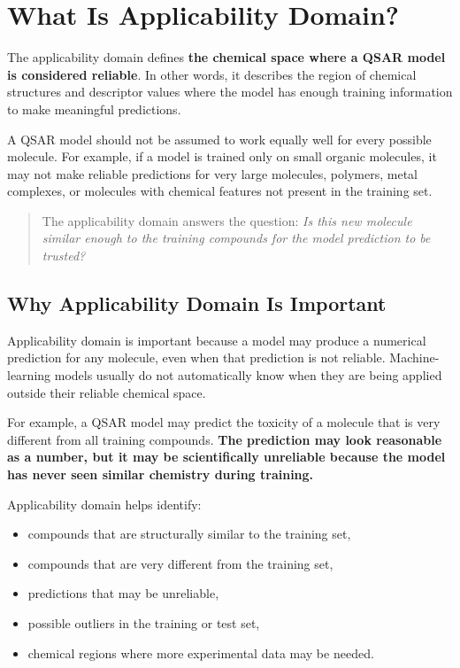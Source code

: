 \documentclass[11pt]{report}
\newenvironment{Important note}{\begin{quote}\color{red}\textbf{Important note:} }{\end{quote}}
\begin{document}
\section{What Is Applicability Domain?}

The applicability domain defines \textbf{the chemical space where a QSAR model is considered reliable}. In other words, it describes the region of chemical structures and descriptor values where the model has enough training information to make meaningful predictions.

A QSAR model should not be assumed to work equally well for every possible molecule. For example, if a model is trained only on small organic molecules, it may not make reliable predictions for very large molecules, polymers, metal complexes, or molecules with chemical features not present in the training set.

\begin{quote}
The applicability domain answers the question: \textit{Is this new molecule similar enough to the training compounds for the model prediction to be trusted?}
\end{quote}

\subsection{Why Applicability Domain Is Important}

Applicability domain is important because a model may produce a numerical prediction for any molecule, even when that prediction is not reliable. Machine-learning models usually do not automatically know when they are being applied outside their reliable chemical space.

For example, a QSAR model may predict the toxicity of a molecule that is very different from all training compounds. \textbf{The prediction may look reasonable as a number, but it may be scientifically unreliable because the model has never seen similar chemistry during training.}

Applicability domain helps identify:

\begin{itemize}[leftmargin=*]
    \item compounds that are structurally similar to the training set,
    \item compounds that are very different from the training set,
    \item predictions that may be unreliable,
    \item possible outliers in the training or test set,
    \item chemical regions where more experimental data may be needed.
\end{itemize}
\end{document}
